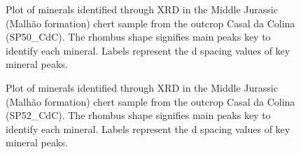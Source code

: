 \documentclass[
  a4paper,
  DIV=11,
  numbers=noendperiod]{scrreprt}
\begin{document}
\begin{figure}


\caption{\label{fig-xrd-sp50}Plot of minerals identified through XRD in
the Middle Jurassic (Malhão formation) chert sample from the outcrop
Casal da Colina (SP50\_CdC). The rhombus shape signifies main peaks key
to identify each mineral. Labels represent the d spacing values of key
mineral peaks.}

\end{figure}%

\begin{figure}


\caption{\label{fig-xrd-sp52}Plot of minerals identified through XRD in
the Middle Jurassic (Malhão formation) chert sample from the outcrop
Casal da Colina (SP52\_CdC). The rhombus shape signifies main peaks key
to identify each mineral. Labels represent the d spacing values of key
mineral peaks.}

\end{figure}%
\end{document}
